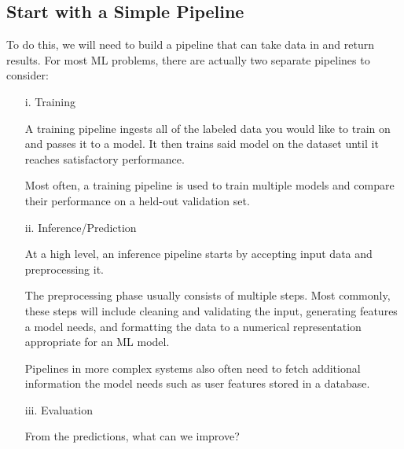 \subsection*{Start with a Simple Pipeline}
To do this, we will need to build a pipeline that can take data in and
return results. For most ML problems, there are actually two separate
pipelines to consider:
\begin{enumerate}
    \item[i. Training] 
    
    A training pipeline ingests all of the labeled data you would like
    to train on and passes it to a model. It then trains said model on
    the dataset until it reaches satisfactory performance.
    
    Most often, a training pipeline is used to train multiple models
    and compare their performance on a held-out validation set.


    \item[ii. Inference/Prediction] 

    At a high level, an inference pipeline starts by accepting input
    data and preprocessing it.
    
    The preprocessing phase usually consists of multiple steps. Most
    commonly, these steps will include cleaning and validating the
    input, generating features a model needs, and formatting the data
    to a numerical representation appropriate for an ML model.
    
    Pipelines in more complex systems also often need to fetch
    additional information the model needs such as user features
    stored in a database.


    \item[iii. Evaluation]
    
    From the predictions, what can we improve?
\end{enumerate}